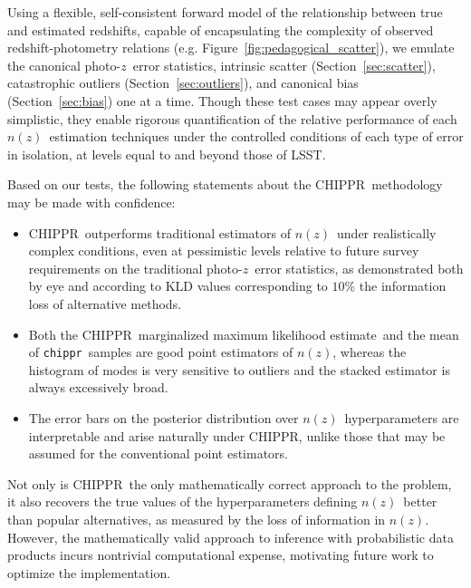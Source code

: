 \documentclass[iop]{emulateapj}
\newcommand{\todo}[3]{{\color{#2}\emph{#1}: #3}}
\newcommand{\aim}[1]{\todo{AIM}{red}{#1}}
\newcommand{\Sect}[1]{Section~\ref{#1}}
\newcommand{\Fig}[1]{Figure~\ref{#1}}
\newcommand{\project}[1]{\textsc{#1}}
\newcommand{\lsst}{\project{LSST}}
\newcommand{\Chippr}{\project{CHIPPR}}%
\newcommand{\repo}[1]{\texttt{#1}}
\newcommand{\chippr}{\repo{chippr}}
\newcommand{\pz}{photo-$z$}
\newcommand{\nz}{$n(z)$}
\newcommand{\Nz}{$N(z)$}
\newcommand{\mmle}{marginalized maximum likelihood estimate}%
\begin{document}
Using a flexible, self-consistent forward model of the relationship between true and estimated redshifts, capable of encapsulating the complexity of observed redshift-photometry relations (e.g. \Fig{fig:pedagogical_scatter}), we emulate the canonical \pz\ error statistics, intrinsic scatter (\Sect{sec:scatter}), catastrophic outliers (\Sect{sec:outliers}), and canonical bias (\Sect{sec:bias}) one at a time.
Though these test cases may appear overly simplistic, they enable rigorous quantification of the relative performance of each \nz\ estimation techniques under the controlled conditions of each type of error in isolation, at levels equal to and beyond those of \lsst.

Based on our tests, the following statements about the \Chippr\ methodology may be made with confidence:
\begin{itemize}
\item \Chippr\ outperforms traditional estimators of \nz\ under realistically complex conditions, even at pessimistic levels relative to future survey requirements on the traditional \pz\ error statistics, as demonstrated both by eye and according to KLD values corresponding to $10\%$ the information loss of alternative methods.
\item Both the \Chippr\ \mmle\ and the mean of \chippr\ samples are good point estimators of \nz, whereas the histogram of modes is very sensitive to outliers and the stacked estimator is always excessively broad.
\item The error bars on the posterior distribution over \nz\ hyperparameters are interpretable and arise naturally under \Chippr, unlike those that may be assumed for the conventional point estimators.
\end{itemize}
Not only is \Chippr\ the only mathematically correct approach to the problem, it also recovers the true values of the hyperparameters defining \nz\ better than popular alternatives, as measured by the loss of information in \nz.
However, the mathematically valid approach to inference with probabilistic data products incurs nontrivial computational expense, motivating future work to optimize the implementation.
\end{document}
